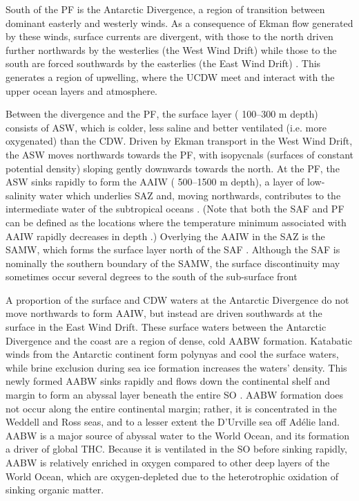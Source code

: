 South of the \ac{PF} is the Antarctic Divergence, a region of transition between dominant easterly and westerly winds.
As a consequence of Ekman flow generated by these winds, surface currents are divergent, with those to the north driven further northwards by the westerlies (the West Wind Drift) while those to the south are forced southwards by the easterlies (the East Wind Drift) \cite{Foldvik:1988gp}.
This generates a region of upwelling, where the \ac{UCDW} meet and interact with the upper ocean layers and atmosphere.

Between the divergence and the \ac{PF}, the surface layer (\textapprox{} 100--300 m depth) consists of \ac{ASW}, which is colder, less saline and better ventilated (i.e. more oxygenated) than the \ac{CDW}.
Driven by Ekman transport in the West Wind Drift, the \ac{ASW} moves northwards towards the \ac{PF}, with isopycnals (surfaces of constant potential density) sloping gently downwards towards the north.
At the \ac{PF}, the \ac{ASW} sinks rapidly to form the \ac{AAIW} (\textapprox{} 500--1500 m depth), a layer of low-salinity water which underlies \ac{SAZ} and, moving northwards, contributes to the intermediate water of the subtropical oceans \cite{Foldvik:1988gp}.
(Note that both the \ac{SAF} and \ac{PF} can be defined as the locations where the temperature minimum associated with \ac{AAIW} rapidly decreases in depth \cite{WhitworthIII:1987ky}.)
Overlying the \ac{AAIW} in the \ac{SAZ} is the \ac{SAMW}, which forms the surface layer north of the \ac{SAF} \cite{Speer:2000th}.
Although the \ac{SAF} is nominally the southern boundary of the \ac{SAMW}, the surface discontinuity may sometimes occur several degrees to the south of the sub-surface front \citep[e.g.][]{Deacon:1982ce,Orsi:1995va}

A proportion of the surface and \ac{CDW} waters at the Antarctic Divergence do not move northwards to form \ac{AAIW}, but instead are driven southwards at the surface in the East Wind Drift.
These surface waters between the Antarctic Divergence and the coast are a region of dense, cold \ac{AABW} formation.
Katabatic winds from the Antarctic continent form polynyas and cool the surface waters, while brine exclusion during sea ice formation increases the waters' density.
This newly formed \ac{AABW} sinks rapidly and flows down the continental shelf and margin to form an abyssal layer beneath the entire \ac{SO} \cite{Orsi:1999hz,Foldvik:1988gp}.
\ac{AABW} formation does not occur along the entire continental margin; rather, it is concentrated in the Weddell and Ross seas, and to a lesser extent the D'Urville sea off Ad\'{e}lie land.
\ac{AABW} is a major source of abyssal water to the World Ocean, and its formation a driver of global \ac{THC}.
Because it is ventilated in the \ac{SO} before sinking rapidly, \ac{AABW} is relatively enriched in oxygen compared to other deep layers of the World Ocean, which are oxygen-depleted due to the heterotrophic oxidation of sinking organic matter.

